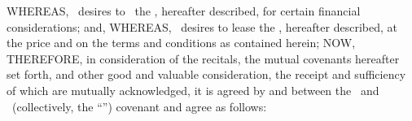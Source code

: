 \indent WHEREAS, \lessor\ desires to \lease\ the \property, hereafter described, for certain financial considerations; and,
\newline
\indent WHEREAS, \lessee\ desires to lease the \property, hereafter described, at the price and on the terms and conditions as contained herein;
\newline
\indent NOW, THEREFORE, in consideration of the recitals, the mutual covenants hereafter set forth, and other good and valuable consideration, the receipt and sufficiency of which are mutually acknowledged, it is agreed by and between the \lessor\ and \lessee\ (collectively, the “\parties”) covenant and agree as follows:
